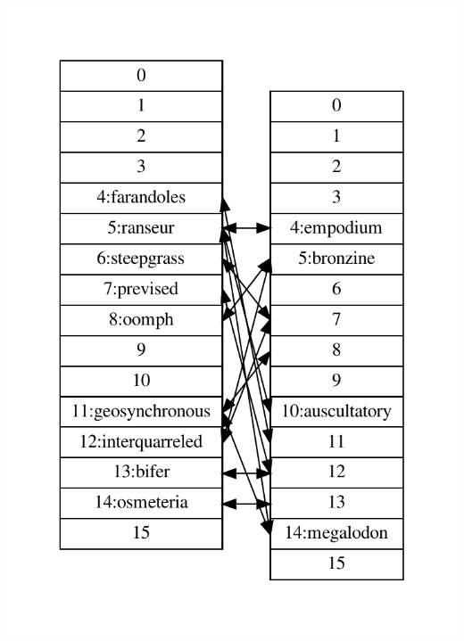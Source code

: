 \begin{frame}[fragile]
\begin{columns}[T]
\pause
\begin{column}{0.45\textwidth}
\begin{center}
\includegraphics[height=0.8\textheight]{../Images/cuckoo.pdf}
\end{center}
\end{column}

\end{columns}
\end{frame}

\endinput 
